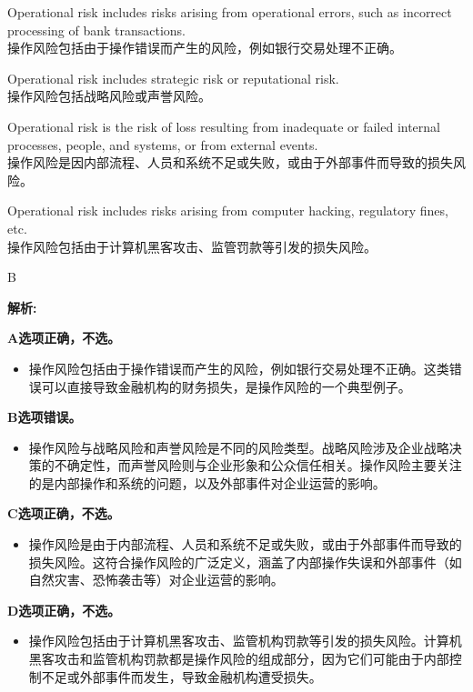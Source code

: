 \documentclass{article}
\newenvironment{explanation}
{\textbf{解析:}\par}
{\par}
\begin{document}
    \begin{choices}
        \item Operational risk includes risks arising from operational errors, such as incorrect processing of bank transactions.\\
        操作风险包括由于操作错误而产生的风险，例如银行交易处理不正确。
        \item Operational risk includes strategic risk or reputational risk.\\
        操作风险包括战略风险或声誉风险。
        \item Operational risk is the risk of loss resulting from inadequate or failed internal processes, people, and systems, or from external events.\\
        操作风险是因内部流程、人员和系统不足或失败，或由于外部事件而导致的损失风险。
        \item Operational risk includes risks arising from computer hacking, regulatory fines, etc.\\
        操作风险包括由于计算机黑客攻击、监管罚款等引发的损失风险。
    \end{choices}
    
    \begin{correctanswer}
        B
    \end{correctanswer}
    
    \begin{explanation}
        \textbf{A选项正确，不选。}
        \begin{itemize}
            \item 操作风险包括由于操作错误而产生的风险，例如银行交易处理不正确。这类错误可以直接导致金融机构的财务损失，是操作风险的一个典型例子。
        \end{itemize}
    
        \textbf{B选项错误。}
        \begin{itemize}
            \item 操作风险与战略风险和声誉风险是不同的风险类型。战略风险涉及企业战略决策的不确定性，而声誉风险则与企业形象和公众信任相关。操作风险主要关注的是内部操作和系统的问题，以及外部事件对企业运营的影响。
        \end{itemize}
    
        \textbf{C选项正确，不选。}
        \begin{itemize}
            \item 操作风险是由于内部流程、人员和系统不足或失败，或由于外部事件而导致的损失风险。这符合操作风险的广泛定义，涵盖了内部操作失误和外部事件（如自然灾害、恐怖袭击等）对企业运营的影响。
        \end{itemize}
    
        \textbf{D选项正确，不选。}
        \begin{itemize}
            \item 操作风险包括由于计算机黑客攻击、监管机构罚款等引发的损失风险。计算机黑客攻击和监管机构罚款都是操作风险的组成部分，因为它们可能由于内部控制不足或外部事件而发生，导致金融机构遭受损失。
        \end{itemize}
    \end{explanation}
    
\end{document}
